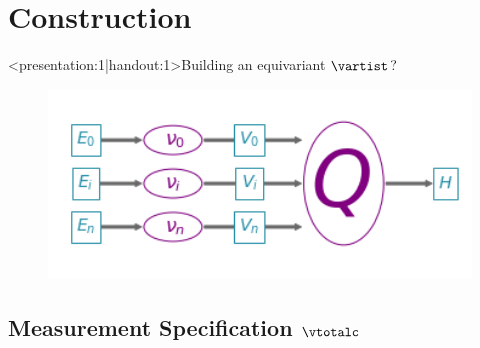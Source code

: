 \documentclass[xcolor={dvipsnames}]{beamer}
\begin{document}
\section{Construction}
\begin{frame}<presentation:1|handout:1>{Building an equivariant $\vartist$?}
    \begin{figure}
        \includegraphics[width=1\textwidth]{../paper/figures/path_of_q.png}
    \end{figure}
\end{frame}


\subsection{Measurement Specification $\vtotalc$}
\end{document}
